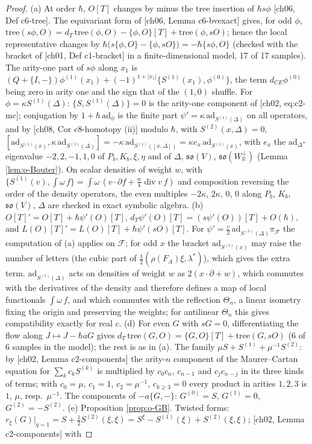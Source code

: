 \begin{proof}
(a) At order $\hbar$, $O[T]$ changes by minus the tree insertion of $\hbar s\phi$ [ch06, Def c6-tree]. The equivariant form of [ch06, Lemma c6-bvexact] gives, for odd $\phi$, $\mathrm{tree}(s\phi,O)=d_T\,\mathrm{tree}(\phi,O)-\{\phi,O\}[T]+\mathrm{tree}(\phi,sO)$; hence the local representative changes by $\hbar\big(s\{\phi,O\}-\{\phi,sO\}\big)=-\hbar\{s\phi,O\}$ (checked with the bracket of [ch01, Def c1-bracket] in a finite-dimensional model, 17 of 17 samples). The arity-one part of $s\phi$ along $x_1$ is $(Q+\{I,-\})\phi^{(1)}(x_1)+(-1)^{1+|x_1|}\{S^{(1)}(x_1),\phi^{(0)}\}$, the term $d_{CE}\phi^{(0)}$ being zero in arity one and the sign that of the $(1,0)$ shuffle. For $\phi=\kappa S^{(1)}(\Delta)$: $\{S,S^{(1)}(\Delta)\}=0$ is the arity-one component of [ch02, eq:c2-mc]; conjugation by $1+\hbar\,\mathrm{ad}_\phi$ is the finite part $\psi'=\kappa\,\mathrm{ad}_{S^{(1)}(\Delta)}$ on all operators, and by [ch08, Cor c8-homotopy (ii)] modulo $\hbar$, with $S^{(2)}(x,\Delta)=0$, $[\mathrm{ad}_{S^{(1)}(x)},\kappa\,\mathrm{ad}_{S^{(1)}(\Delta)}]=-\kappa\,\mathrm{ad}_{S^{(1)}([x,\Delta])}=\kappa e_x\,\mathrm{ad}_{S^{(1)}(x)}$, with $e_x$ the $\mathrm{ad}_\Delta$-eigenvalue $-2,2,-1,1,0$ of $P_b,K_b,\xi,\eta$ and of $\Delta$, $\mathfrak{so}(V)$, $\mathfrak{so}(W_{\mathbb R}^\perp)$ (Lemma \ref{lem:o-Bouter}). On scalar densities of weight $w$, with $\{S^{(1)}(v),\int\omega\,f\}=\int\omega\,(v\cdot\partial f+\tfrac w4\operatorname{div}v\,f)$ and composition reversing the order of the density operators, the even multiples $-2\kappa$, $2\kappa$, $0$, $0$ along $P_b$, $K_b$, $\mathfrak{so}(V)$, $\Delta$ are checked in exact symbolic algebra. (b) $O[T]'=O[T]+\hbar\psi'(O)[T]$, $d_T\psi'(O)[T]=(s\psi'(O))[T]+O(\hbar)$, and $L(O)[T]'=L(O)[T]+\hbar\psi'(sO)[T]$. For $\psi'=\tfrac c2\,\mathrm{ad}_{S^{(1)}(\Delta)}\pi_{\mathcal F}$ the computation of (a) applies on $\mathcal F$; for odd $x$ the bracket $\mathrm{ad}_{S^{(1)}(x)}$ may raise the number of letters (the cubic part of $\tfrac12(\rho(F_A)\xi,\lambda^*)$), which gives the extra term. $\mathrm{ad}_{S^{(1)}(\Delta)}$ acts on densities of weight $w$ as $2(x\cdot\partial+w)$, which commutes with the derivatives of the density and therefore defines a map of local functionals $\int\omega\,f$, and which commutes with the reflection $\Theta_n$, a linear isometry fixing the origin and preserving the weights; for antilinear $\Theta_n$ this gives compatibility exactly for real $c$. (d) For even $G$ with $sG=0$, differentiating the flow along $J\mapsto J-\hbar aG$ gives $d_T\,\mathrm{tree}(G,O)=\{G,O\}[T]+\mathrm{tree}(G,sO)$ (6 of 6 samples in the model); the rest is as in (a). The family $\mu S+S^{(1)}+\mu^{-1}S^{(2)}$: by [ch02, Lemma c2-components] the arity-$n$ component of the Maurer--Cartan equation for $\sum_kc_kS^{(k)}$ is multiplied by $c_0c_n$, $c_{n-1}$ and $c_jc_{n-j}$ in its three kinds of terms; with $c_0=\mu$, $c_1=1$, $c_2=\mu^{-1}$, $c_{k\ge3}=0$ every product in arities $1,2,3$ is $1$, $\mu$, resp.\ $\mu^{-1}$. The components of $-a\{G,-\}$: $G^{(0)}=S$, $G^{(1)}=0$, $G^{(2)}=-S^{(2)}$. (e) Proposition \ref{prop:o-GB}. Twisted forms: $r_\xi(G)|_{q=1}=S+\tfrac12S^{(2)}(\xi,\xi)=S^\xi-S^{(1)}(\xi)+S^{(2)}(\xi,\xi)$; [ch02, Lemma c2-components] with 
\end{proof}
